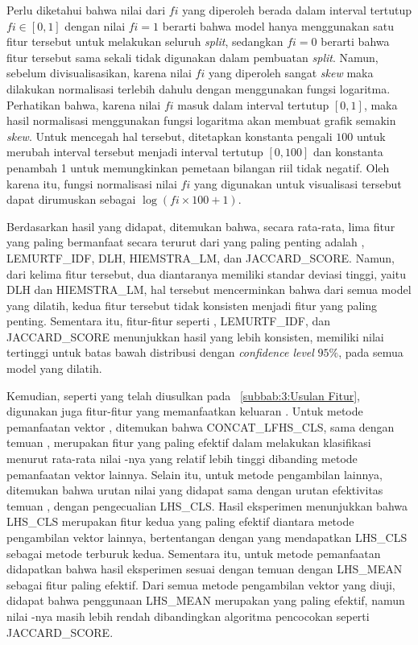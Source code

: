 Perlu diketahui bahwa nilai dari \feature{} \importance{} $fi$ yang diperoleh berada dalam interval tertutup $fi\in[0,1]$ dengan nilai $fi=1$ berarti bahwa model hanya menggunakan satu fitur tersebut untuk melakukan seluruh \textit{split}, sedangkan $fi=0$ berarti bahwa fitur tersebut sama sekali tidak digunakan dalam pembuatan \textit{split}. Namun, sebelum divisualisasikan, karena nilai $fi$ yang diperoleh  sangat \textit{skew} maka dilakukan normalisasi terlebih dahulu dengan menggunakan fungsi logaritma. Perhatikan bahwa, karena nilai $fi$ masuk dalam interval tertutup $[0,1]$, maka hasil normalisasi menggunakan fungsi logaritma akan membuat grafik semakin \textit{skew}. Untuk mencegah hal tersebut, ditetapkan konstanta pengali $100$ untuk merubah interval tersebut menjadi interval tertutup $[0,100]$ dan konstanta penambah 1 untuk memungkinkan pemetaan bilangan riil tidak negatif. Oleh karena itu, fungsi normalisasi nilai $fi$ yang digunakan untuk visualisasi tersebut dapat dirumuskan sebagai $\log(fi \times 100+1)$.

Berdasarkan hasil yang didapat, ditemukan bahwa, secara rata-rata, lima fitur yang paling bermanfaat secara terurut dari yang paling penting adalah \obm{}, LEMURTF\_IDF, DLH, HIEMSTRA\_LM, dan JACCARD\_SCORE. Namun, dari kelima fitur tersebut, dua diantaranya memiliki standar deviasi tinggi, yaitu DLH dan HIEMSTRA\_LM, hal tersebut mencerminkan bahwa dari semua model \lambdamart{} yang dilatih, kedua fitur tersebut tidak konsisten menjadi fitur yang paling penting. Sementara itu, fitur-fitur seperti \obm{}, LEMURTF\_IDF, dan JACCARD\_SCORE menunjukkan hasil yang lebih konsisten, memiliki nilai tertinggi untuk batas bawah distribusi dengan \textit{confidence level} $95\%$, pada semua model yang dilatih.

Kemudian, seperti yang telah diusulkan pada \subbab{}~\ref{subbab:3:Usulan Fitur}, digunakan juga fitur-fitur yang memanfaatkan keluaran \encoder{}. Untuk metode pemanfaatan vektor \encoder{} \bert{}, ditemukan bahwa CONCAT\_LFHS\_CLS, sama dengan temuan \citet{devlin2018bert}, merupakan fitur yang paling efektif dalam melakukan klasifikasi menurut rata-rata nilai \importance{}-nya yang relatif lebih tinggi dibanding metode pemanfaatan vektor \bert{} lainnya. Selain itu, untuk metode pengambilan lainnya, ditemukan bahwa urutan nilai \importance{} yang didapat sama dengan urutan efektivitas temuan \citet{devlin2018bert}, dengan pengecualian LHS\_CLS. Hasil eksperimen menunjukkan bahwa LHS\_CLS merupakan fitur kedua yang paling efektif diantara metode pengambilan vektor \bert{} lainnya, bertentangan dengan \citet{devlin2018bert} yang mendapatkan LHS\_CLS sebagai metode terburuk kedua. Sementara itu, untuk metode pemanfaatan \encoder{} \tfive{} didapatkan bahwa hasil eksperimen sesuai dengan temuan \citet{ni2021sentence} dengan LHS\_MEAN sebagai fitur paling efektif. Dari semua metode pengambilan vektor yang diuji, didapat bahwa penggunaan LHS\_MEAN \encoder{} \tfive{} merupakan yang paling efektif, namun nilai \importance{}-nya masih lebih rendah dibandingkan algoritma pencocokan seperti JACCARD\_SCORE.

